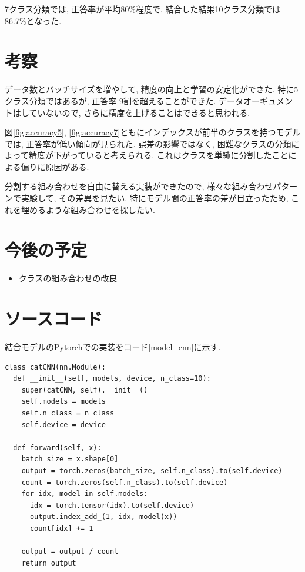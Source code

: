 \documentclass[twocolumn]{jarticle}     %
\begin{document}
7クラス分類では, 正答率が平均80\%程度で, 結合した結果10クラス分類では86.7\%となった.

\section{考察}
データ数とバッチサイズを増やして, 精度の向上と学習の安定化ができた. 特に5クラス分類ではあるが, 正答率 9割を超えることができた. データオーギュメントはしていないので, さらに精度を上げることはできると思われる.

図\ref{fig:accuracy5}, \ref{fig:accuracy7}ともにインデックスが前半のクラスを持つモデルでは, 正答率が低い傾向が見られた. 誤差の影響ではなく, 困難なクラスの分類によって精度が下がっていると考えられる. これはクラスを単純に分割したことによる偏りに原因がある.

分割する組み合わせを自由に替える実装ができたので, 様々な組み合わせパターンで実験して, その差異を見たい.
特にモデル間の正答率の差が目立ったため, これを埋めるような組み合わせを探したい.

\section{今後の予定}
\begin{itemize}
	\item {クラスの組み合わせの改良}
\end{itemize}


\section{ソースコード}

結合モデルのPytorchでの実装をコード\ref{model_cnn}に示す.

\begin{lstlisting}[caption=concat,label=model_cnn]
class catCNN(nn.Module):
  def __init__(self, models, device, n_class=10):
    super(catCNN, self).__init__()
    self.models = models
    self.n_class = n_class
    self.device = device

  def forward(self, x):
    batch_size = x.shape[0]
    output = torch.zeros(batch_size, self.n_class).to(self.device)
    count = torch.zeros(self.n_class).to(self.device)
    for idx, model in self.models:
      idx = torch.tensor(idx).to(self.device)
      output.index_add_(1, idx, model(x))
      count[idx] += 1

    output = output / count
    return output
\end{lstlisting}




\end{document}
